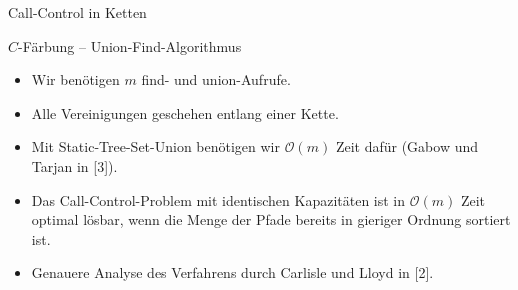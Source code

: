 \begin{section}{Call-Control in Ketten}
\begin{frame}{$C$-Färbung -- Union-Find-Algorithmus}
	\begin{itemize}
		\pause\item Wir benötigen $m$ find- und union-Aufrufe.
		\pause\item Alle Vereinigungen geschehen entlang einer Kette.
		\pause\item Mit Static-Tree-Set-Union benötigen wir $\mathcal{O}(m)$ Zeit dafür (Gabow und Tarjan in [3]).
		\pause\item Das Call-Control-Problem mit identischen Kapazitäten ist in $\mathcal{O}(m)$ Zeit optimal lösbar, wenn die Menge der Pfade bereits in gieriger Ordnung sortiert ist.
		\pause\item Genauere Analyse des Verfahrens durch Carlisle und Lloyd in [2].
	\end{itemize}
\end{frame}


\end{section}
